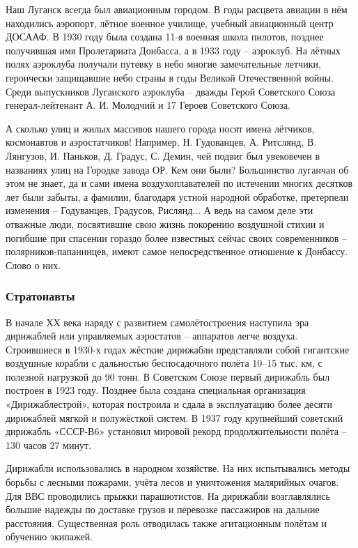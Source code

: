 Наш Луганск всегда был авиационным городом. В годы расцвета авиации в нём
находились аэропорт, лётное военное училище, учебный авиационный центр ДОСААФ.
В 1930 году была создана 11-я военная школа пилотов, позднее получившая имя
Пролетариата Донбасса, а в 1933 году – аэроклуб. На лётных полях аэроклуба
получали путевку в небо многие замечательные летчики, героически защищавшие
небо страны в годы Великой Отечественной войны. Среди выпускников Луганского
аэроклуба – дважды Герой Советского Союза генерал-лейтенант А. И. Молодчий и 17
Героев Советского Союза.

А сколько улиц и жилых массивов нашего города носят имена лётчиков, космонавтов
и аэростатчиков! Например, Н. Гудованцев, А. Ритслянд, В. Лянгузов, И. Паньков,
Д. Градус, С. Демин, чей подвиг был увековечен в названиях улиц на Городке
завода ОР. Кем они были? Большинство луганчан об этом не знает, да и сами имена
воздухоплавателей по истечении многих десятков лет были забыты, а фамилии,
благодаря устной народной обработке, претерпели изменения – Годуванцев,
Градусов, Рислянд... А ведь на самом деле эти отважные люди, посвятившие свою
жизнь покорению воздушной стихии и погибшие при спасении гораздо более
известных сейчас своих современников – полярников-папанинцев, имеют самое
непосредственное отношение к Донбассу. Слово о них.

\subsubsection{Стратонавты}

В начале ХХ века наряду с развитием самолётостроения наступила эра дирижаблей
или управляемых аэростатов – аппаратов легче воздуха. Строившиеся в 1930-х
годах жёсткие дирижабли представляли собой гигантские воздушные корабли с
дальностью беспосадочного полёта 10–15 тыс. км, с полезной нагрузкой до 90
тонн. В Советском Союзе первый дирижабль был построен в 1923 году. Позднее была
создана специальная организация «Дирижаблестрой», которая построила и сдала в
эксплуатацию более десяти дирижаблей мягкой и полужёсткой систем. В 1937 году
крупнейший советский дирижабль «СССР-В6» установил мировой рекорд
продолжительности полёта – 130 часов 27 минут. 

Дирижабли использовались в народном хозяйстве. На них испытывались методы
борьбы с лесными пожарами, учёта лесов и уничтожения малярийных очагов. Для ВВС
проводились прыжки парашютистов. На дирижабли возглавлялись большие надежды по
доставке грузов и перевозке пассажиров на дальние расстояния. Существенная роль
отводилась также агитационным полётам и обучению экипажей.

